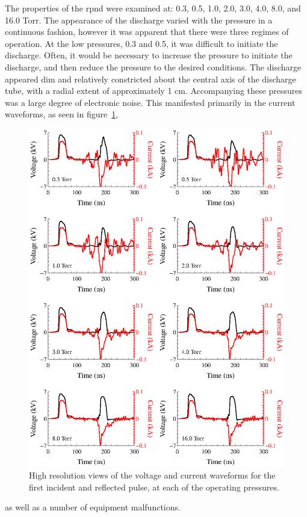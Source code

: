 The properties of the \acs{rpnd} were examined at: 0.3, 0.5, 1.0, 2.0, 3.0, 4.0,
8.0, and 16.0 Torr. The appearance of the discharge varied with the pressure in
a continuous fashion, however it was apparent that there were three regimes of
operation. At the low pressures, 0.3 and 0.5, it was difficult to initiate the
discharge. Often, it would be necessary to increase the pressure to initiate the
discharge, and then reduce the pressure to the desired conditions. The discharge
appeared dim and relatively constricted about the central axis of the discharge
tube, with a radial extent of approximately 1 cm. Accompanying these pressures
was a large degree of electronic noise. This manifested primarily in the current
waveforms, as seen in figure~\ref{fig:waveforms},
\begin{figure}
  \centering
  \includegraphics{./chapters/experiment/figures/waveforms.eps}
  \caption{High resolution views of the voltage and current waveforms for the
  first incident and reflected pulse, at each of the operating pressures.}
  \label{fig:waveforms}
\end{figure}
as well as a number of equipment malfunctions.

